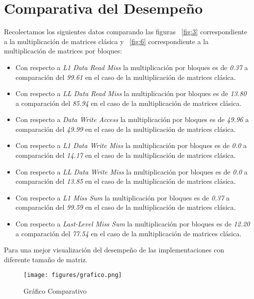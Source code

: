 \documentclass[paper=a4, fontsize=11pt]{scrartcl}
\numberwithin{equation}{section}		%
\numberwithin{figure}{section}			%
\numberwithin{table}{section}				%
\begin{document}
\section{Comparativa del Desempeño} 
Recolectamos los siguientes datos comparando las figuras \figurename~\ref{fig:3} correspondiente a la multiplicación de matrices clásica y \figurename~\ref{fig:6} correspondiente a la multiplicación de matrices por bloques:
\begin{itemize}
    \item Con respecto a \textit{L1 Data Read Miss} la multiplicación por bloques es de \textit{0.37} a comparación del \textit{99.61} en el caso de la multiplicación de matrices clásica.
    \item Con respecto a \textit{LL Data Read Miss} la multiplicación por bloques es de \textit{13.80} a comparación del \textit{85.94} en el caso de la multiplicación de matrices clásica.
    \item Con respecto a \textit{Data Write Access} la multiplicación por bloques es de \textit{49.96} a comparación del \textit{49.99} en el caso de la multiplicación de matrices clásica.
    \item Con respecto a \textit{L1 Data Write Miss} la multiplicación por bloques es de \textit{0.0} a comparación del \textit{14.17} en el caso de la multiplicación de matrices clásica.
    \item Con respecto a \textit{LL Data Write Miss} la multiplicación por bloques es de \textit{0.0} a comparación del \textit{13.85} en el caso de la multiplicación de matrices clásica.
    \item Con respecto a \textit{L1 Miss Sum} la multiplicación por bloques es de \textit{0.37} a comparación del \textit{99.59} en el caso de la multiplicación de matrices clásica.
    \item Con respecto a \textit{Last-Level Miss Sum} la multiplicación por bloques es de \textit{12.20} a comparación del \textit{77.54} en el caso de la multiplicación de matrices clásica.
\end{itemize}

Para una mejor visualización del desempeño de las implementaciones con diferente tamaño de matriz.

\begin{figure}[!h]
  \centering
  \texttt{[image: figures/grafico.png]}
  \caption{Gráfico Comparativo }
  \label{fig:ec01}
\end{figure}
\end{document}

